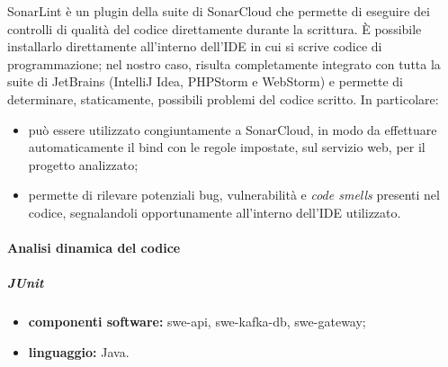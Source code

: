	                SonarLint è un plugin della suite di SonarCloud che permette di eseguire dei controlli di qualità del codice direttamente durante la scrittura. 
	                \newline
	                È possibile installarlo direttamente all'interno dell'IDE in cui si scrive codice di programmazione; nel nostro caso, risulta completamente integrato con tutta la suite di JetBrains (IntelliJ Idea, PHPStorm e WebStorm) e permette di determinare, staticamente, possibili problemi del codice scritto. In particolare:
		            \begin{itemize}
		            	\item può essere utilizzato congiuntamente a SonarCloud, in modo da effettuare automaticamente il bind con le regole impostate, sul servizio web, per il progetto analizzato;
		            	\item permette di rilevare potenziali bug, vulnerabilità e \textit{code smells} presenti nel codice, segnalandoli opportunamente all'interno dell'IDE utilizzato.
		            \end{itemize}
                
		
		\paragraph{Analisi dinamica del codice}
                
			\subparagraph{JUnit}
			
				\begin{itemize}
					\item \textbf{componenti software:} swe-api, swe-kafka-db, swe-gateway;
					\item \textbf{linguaggio:} Java.
				\end{itemize}
				

